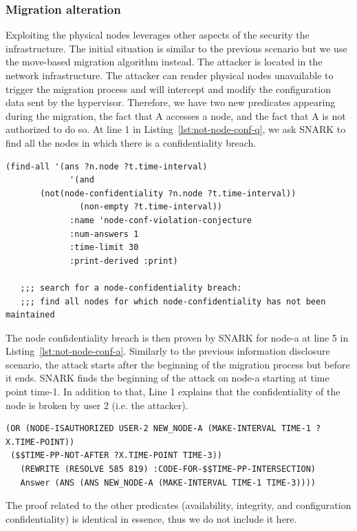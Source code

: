 \subsubsection{Migration alteration}
Exploiting the physical nodes leverages other aspects of the security the infrastructure.
The initial situation is similar to the previous scenario but we use the move-based migration algorithm instead.
The attacker is located in the network infrastructure.
The attacker can render physical nodes unavailable to trigger the migration process and will intercept and modify the configuration data sent by the hypervisor. 
Therefore, we have two new predicates appearing during the migration, the fact that A accesses a node, and the fact that A is not authorized to do so.
At line 1 in Listing~\ref{lst:not-node-conf-q}, we ask SNARK to find all the nodes in which there is a confidentiality breach.

\begin{lstlisting}[caption=SNARK question to detect the node confidentiality violation., label=lst:not-node-conf-q] 
   (find-all '(ans ?n.node ?t.time-interval)
             '(and
       (not(node-confidentiality ?n.node ?t.time-interval))
               (non-empty ?t.time-interval))
             :name 'node-conf-violation-conjecture
             :num-answers 1
             :time-limit 30
             :print-derived :print)

   ;;; search for a node-confidentiality breach:
   ;;; find all nodes for which node-confidentiality has not been maintained
\end{lstlisting}
The node confidentiality breach is then proven by SNARK for node-a at line 5 in Listing~\ref{lst:not-node-conf-a}.
Similarly to the previous information disclosure scenario, the attack starts after the beginning of the migration process but before it ends.
SNARK finds the beginning of the attack on node-a starting at time point time-1.
In addition to that, Line 1 explains that the confidentiality of the node is broken by user 2 (i.e. the attacker).

\begin{lstlisting}[caption=SNARK detecting the node confidentiality violation., label=lst:not-node-conf-a] 
(OR (NODE-ISAUTHORIZED USER-2 NEW_NODE-A (MAKE-INTERVAL TIME-1 ?X.TIME-POINT))
 ($$TIME-PP-NOT-AFTER ?X.TIME-POINT TIME-3))
   (REWRITE (RESOLVE 585 819) :CODE-FOR-$$TIME-PP-INTERSECTION)
   Answer (ANS (ANS NEW_NODE-A (MAKE-INTERVAL TIME-1 TIME-3)))) 
\end{lstlisting}

The proof related to the other predicates (availability, integrity, and configuration confidentiality) is identical in essence, thus we do not include it here.
